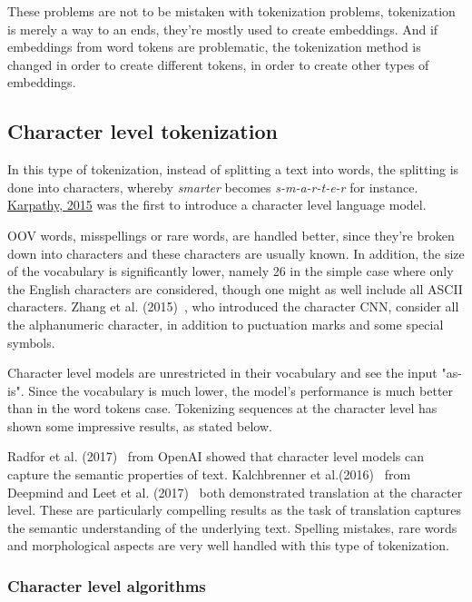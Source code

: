 These problems are not to be mistaken with tokenization problems, tokenization is merely a way to an ends, they're mostly used to create embeddings. And if embeddings from word tokens are problematic, the tokenization method is changed in order to create different tokens, in order to create other types of embeddings.
    
\subsection{Character level tokenization}

In this type of tokenization, instead of splitting a text into words, the splitting is done into characters, whereby \emph{smarter} becomes \emph{s-m-a-r-t-e-r} for instance. \href{https://github.com/karpathy/char-rnn}{Karpathy, 2015} was the first to introduce a character level language model.

OOV words, misspellings or rare words, are handled better, since they're broken down into characters and these characters are usually known. In addition, the size of the vocabulary is significantly lower, namely 26 in the simple case where only the English characters are considered, though one might as well include all ASCII characters. Zhang et al. (2015)~\cite{zhang2015text}, who introduced the character CNN, consider all the alphanumeric character, in addition to puctuation marks and some special symbols.

Character level models are unrestricted in their vocabulary and see the input "as-is". Since the vocabulary is much lower, the model's performance is much better than in the word tokens case. Tokenizing sequences at the character level has shown some impressive results, as stated below.

Radfor et al. (2017)~\cite{radford2017learning} from OpenAI showed that character level models can capture the semantic properties of text. Kalchbrenner et al.(2016)~\cite{kalchbrenner2016neural} from Deepmind and Leet et al. (2017)~\cite{lee-etal-2017-fully} both demonstrated translation at the character level. These are particularly compelling results as the task of translation captures the semantic understanding of the underlying text. Spelling mistakes, rare words and morphological aspects are very well handled with this type of tokenization.

\subsubsection{Character level algorithms}

